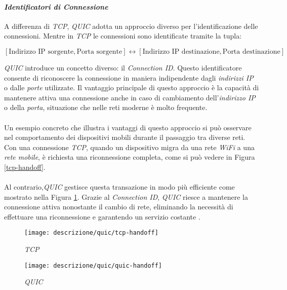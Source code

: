 \paragraph{\textit{Identificatori di Connessione}}
\noindent A differenza di \emph{TCP}, \emph{QUIC} adotta un approccio diverso per l'identificazione delle connessioni. 
Mentre in \emph{TCP} le connessioni sono identificate tramite la tupla:
\begin{center}
\small
$[\text{Indirizzo IP sorgente}, \text{Porta sorgente}] \leftrightarrow [\text{Indirizzo IP destinazione}, \text{Porta destinazione}]$
\end{center}
\emph{QUIC} introduce un concetto diverso: il \emph{Connection ID}. Questo identificatore consente di riconoscere la connessione in maniera indipendente dagli \emph{indirizzi IP} o dalle \emph{porte} utilizzate.
Il vantaggio principale di questo approccio è la capacità di mantenere attiva una connessione anche in caso di cambiamento dell'\emph{indirizzo IP} o della \emph{porta}, situazione che nelle reti moderne è molto frequente.
\\\\
Un esempio concreto che illustra i vantaggi di questo approccio si può osservare nel comportamento dei dispositivi mobili durante il passaggio tra diverse reti.
Con una connessione \emph{TCP}, quando un dispositivo migra da una rete \emph{WiFi} a una \emph{rete mobile}, è richiesta una riconnessione completa, come si può vedere in Figura \ref{tcp-handoff}. 
\\\\
Al contrario,\emph{QUIC} gestisce questa transazione in modo più efficiente come mostrato nella Figura \ref{quic-handoff}. Grazie al \emph{Connection ID}, \emph{QUIC} riesce a mantenere la connessione attiva nonostante il cambio di rete, eliminando la necessità di effettuare una riconnessione e garantendo un servizio costante \cite{site:Explaining-QUIC}.
\begin{figure}[!h]
    \centering
    \begin{minipage}{0.48\textwidth}
        \centering
        \texttt{[image: descrizione/quic/tcp-handoff]}
        \caption{\emph{TCP}}
        \label{tcp-handoff}
    \end{minipage}
    \hfill
    \begin{minipage}{0.48\textwidth}
        \centering
        \texttt{[image: descrizione/quic/quic-handoff]}
        \caption{\emph{QUIC}}
        \label{quic-handoff}
    \end{minipage}
\end{figure}
